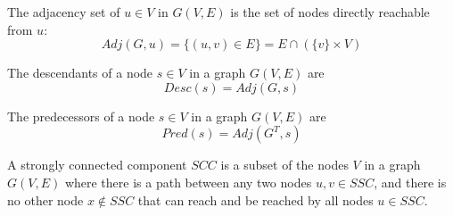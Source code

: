 \begin{definition}
    The adjacency set of $u \in V$ in $G(V,E)$ is the set of nodes directly reachable from $u$:
    \begin{equation*}
        Adj(G, u) = \{(u, v) \in E\} = E \cap (\{v\}\times V)
    \end{equation*}
\end{definition}
\begin{definition}[Descendants] The descendants of a node $s \in V$ in a graph $G(V,E)$ are
    \begin{equation*}
        Desc(s) = Adj(G, s)
    \end{equation*}
\end{definition}
\begin{definition}[Predecessors] The predecessors of a node $s \in V$ in a graph $G(V,E)$ are
    \begin{equation*}
        Pred(s) = Adj(G^T, s)
    \end{equation*}
\end{definition}
\begin{definition}
    A strongly connected component $SCC$ is a subset of the nodes $V$ in a graph $G(V,E)$ where there is a path between any two nodes $u, v \in SSC$, and there is no other node $x \not \in SSC$ that can reach and be reached by all nodes $u \in SSC$.
\end{definition}

